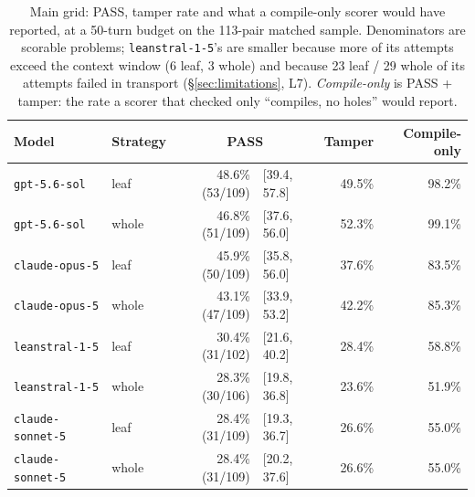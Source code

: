 \documentclass{article}
\begin{document}
\begin{table}[t]
  \caption{Main grid: PASS, tamper rate and what a compile-only scorer would have reported,
  at a 50-turn budget on the 113-pair matched sample. Denominators are scorable problems;
  \texttt{leanstral-1-5}'s are smaller because more of its attempts exceed the context window
  (6 leaf, 3 whole) and because 23 leaf / 29 whole of its attempts failed in transport
  (\S\ref{sec:limitations}, L7). \emph{Compile-only} is PASS + tamper: the rate a scorer that
  checked only ``compiles, no holes'' would report.}
  \label{tab:grid}
  \centering
  \small
  \begin{tabular}{llrlrr}
    \toprule
    Model & Strategy & \multicolumn{2}{c}{PASS} & Tamper & Compile-only \\
    \midrule
    \texttt{gpt-5.6-sol}     & leaf  & 48.6\% (53/109) & [39.4, 57.8] & 49.5\% & 98.2\% \\
    \texttt{gpt-5.6-sol}     & whole & 46.8\% (51/109) & [37.6, 56.0] & 52.3\% & 99.1\% \\
    \texttt{claude-opus-5}   & leaf  & 45.9\% (50/109) & [35.8, 56.0] & 37.6\% & 83.5\% \\
    \texttt{claude-opus-5}   & whole & 43.1\% (47/109) & [33.9, 53.2] & 42.2\% & 85.3\% \\
    \texttt{leanstral-1-5}   & leaf  & 30.4\% (31/102) & [21.6, 40.2] & 28.4\% & 58.8\% \\
    \texttt{leanstral-1-5}   & whole & 28.3\% (30/106) & [19.8, 36.8] & 23.6\% & 51.9\% \\
    \texttt{claude-sonnet-5} & leaf  & 28.4\% (31/109) & [19.3, 36.7] & 26.6\% & 55.0\% \\
    \texttt{claude-sonnet-5} & whole & 28.4\% (31/109) & [20.2, 37.6] & 26.6\% & 55.0\% \\
    \bottomrule
  \end{tabular}
\end{table}
\end{document}
